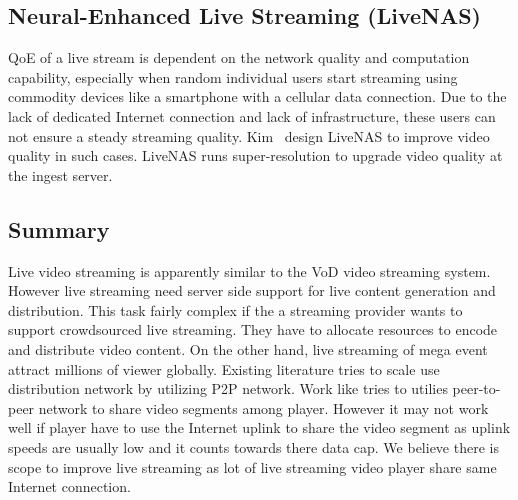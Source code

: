 \subsection{Neural-Enhanced Live Streaming (LiveNAS)}
QoE of a live stream is dependent on the network quality and computation capability, especially when random individual users start streaming using commodity devices like a smartphone with a cellular data connection. Due to the lack of dedicated Internet connection and lack of infrastructure, these users can not ensure a steady streaming quality. Kim \etal\ design LiveNAS\cite{10.1145/3387514.3405856} to improve video quality in such cases. LiveNAS runs super-resolution to upgrade video quality at the ingest server.

\subsection{Summary}
Live video streaming is apparently similar to the VoD video streaming system. However live streaming need server side support for live content generation and distribution. This task fairly complex if the a streaming provider wants to support crowdsourced live streaming. They have to allocate resources to encode and distribute video content. On the other hand, live streaming of mega event attract millions of viewer globally. Existing literature tries to scale use distribution network by utilizing P2P network. Work like \cite{10.1145/2713168.2713182} tries to utilies peer-to-peer network to share video segments among player. However it may not work well if player have to use the Internet uplink to share the video segment as uplink speeds are usually low and it counts towards there data cap. We believe there is scope to improve live streaming as lot of live streaming video player share same Internet connection.